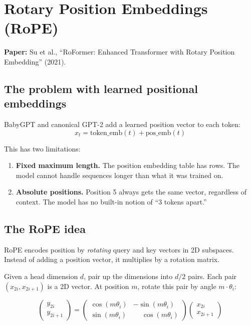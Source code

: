 \section{Rotary Position Embeddings (RoPE)}

\textbf{Paper:} Su et al., ``RoFormer: Enhanced Transformer with Rotary Position Embedding'' (2021).

\subsection{The problem with learned positional embeddings}

BabyGPT and canonical GPT-2 add a learned position vector to each token:
\[
  x_t = \text{token\_emb}(t) + \text{pos\_emb}(t)
\]

This has two limitations:
\begin{enumerate}
  \item \textbf{Fixed maximum length.}  The position embedding table has  rows.  The model cannot handle sequences longer than what it was trained on.
  \item \textbf{Absolute positions.}  Position 5 always gets the same vector, regardless of context.  The model has no built-in notion of ``3 tokens apart.''
\end{enumerate}

\subsection{The RoPE idea}

RoPE encodes position by \emph{rotating} query and key vectors in 2D subspaces.  Instead of adding a position vector, it multiplies by a rotation matrix.

Given a head dimension $d$, pair up the dimensions into $d/2$ pairs.  Each pair $(x_{2i}, x_{2i+1})$ is a 2D vector.  At position $m$, rotate this pair by angle $m \cdot \theta_i$:

\[
\begin{pmatrix} y_{2i} \\ y_{2i+1} \end{pmatrix}
=
\begin{pmatrix}
\cos(m\theta_i) & -\sin(m\theta_i) \\
\sin(m\theta_i) & \phantom{-}\cos(m\theta_i)
\end{pmatrix}
\begin{pmatrix} x_{2i} \\ x_{2i+1} \end{pmatrix}
\]

